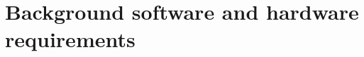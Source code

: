 \documentclass[11pt]{article} %
\begin{document}
\begin{comment}
{\fontfamily{pcr}\selectfont do\_fit}

\textbf{Not yet implemented fully}
This will perform the fit and display the graph on top of the data points
\\

The commands can be sent in any order, separated by semicolons. So a valid command string would be like 

{\fontfamily{pcr}\selectfont config; set\_axis\_labels myX1, myY1; set\_plot\_title myCoolData; ... }

where ... refers to additional commands. It is also ok to send command strings separately, they are processed as they come in, so for example one can send like 

{\fontfamily{pcr}\selectfont config; set\_axis\_labels myX1, myY1; set\_plot\_title myCoolData; ... }

{\fontfamily{pcr}\selectfont config; set\_fit\_function sinewave; set\_curve\_number 0; do\_fit}

Remember that each of the commands has to be sent as a separate session of TCP/IP communication. The thing though is that it's better to send the whole command statement as a single string, because otherwise one can run into problems if one for example calls [do\_fit] before setting the curve number, and so on. 

\end{tcolorbox}

\end{comment}

\section{Background software and hardware requirements}
\end{document}
